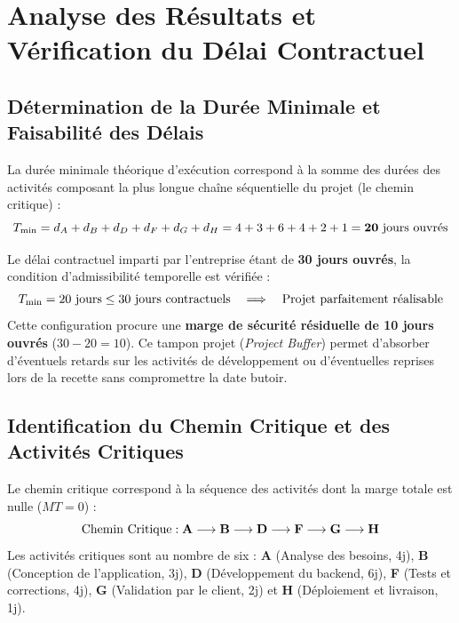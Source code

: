 \documentclass[a4paper,12pt]{report}
\begin{document}
	\clearpage
	\section{Analyse des Résultats et Vérification du Délai Contractuel}
	\enlargethispage{2\baselineskip}
	
	\subsection{Détermination de la Durée Minimale et Faisabilité des Délais}
	La durée minimale théorique d'exécution correspond à la somme des durées des activités composant la plus longue chaîne séquentielle du projet (le chemin critique) :
	\begin{equation}
		\setlength{\abovedisplayskip}{2pt}\setlength{\belowdisplayskip}{2pt}
		T_{\min} = d_A + d_B + d_D + d_F + d_G + d_H = 4 + 3 + 6 + 4 + 2 + 1 = \mathbf{20\text{ jours ouvrés}}
	\end{equation}
	
	Le délai contractuel imparti par l'entreprise étant de \textbf{30 jours ouvrés}, la condition d'admissibilité temporelle est vérifiée :
	\begin{equation}
		\setlength{\abovedisplayskip}{2pt}\setlength{\belowdisplayskip}{2pt}
		T_{\min} = 20\text{ jours} \le 30\text{ jours contractuels} \quad \Longrightarrow \quad \mathbf{\text{Projet parfaitement réalisable}}
	\end{equation}
	Cette configuration procure une \textbf{marge de sécurité résiduelle de 10 jours ouvrés} ($30 - 20 = 10$). Ce tampon projet (\textit{Project Buffer}) permet d'absorber d'éventuels retards sur les activités de développement ou d'éventuelles reprises lors de la recette sans compromettre la date butoir.
	
	\subsection{Identification du Chemin Critique et des Activités Critiques}
	Le chemin critique correspond à la séquence des activités dont la marge totale est nulle ($MT = 0$) :
	\begin{equation}
		\setlength{\abovedisplayskip}{2pt}\setlength{\belowdisplayskip}{2pt}
		\text{Chemin Critique} : \mathbf{A \longrightarrow B \longrightarrow D \longrightarrow F \longrightarrow G \longrightarrow H}
	\end{equation}
	Les activités critiques sont au nombre de six : \textbf{A} (Analyse des besoins, 4j), \textbf{B} (Conception de l'application, 3j), \textbf{D} (Développement du backend, 6j), \textbf{F} (Tests et corrections, 4j), \textbf{G} (Validation par le client, 2j) et \textbf{H} (Déploiement et livraison, 1j).
	
\end{document}

